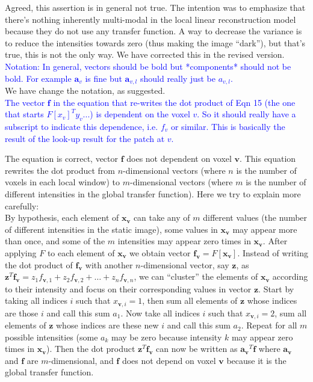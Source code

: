 \documentclass[onecolumn]{IEEEtran}
\begin{document}
Agreed, this assertion is in general not true. The intention was to emphasize that there’s nothing inherently multi-modal in the local linear reconstruction model because they do not use any transfer function. A way to decrease the variance is to reduce the intensities towards zero (thus making the image “dark”), but that’s true, this is not the only way. We have corrected this in the revised version.\\

\textcolor{blue}{Notation: In general, vectors should be bold but *components* should not be bold. For example $\mathbf{a}_v$ is fine but $\mathbf{a}_{v,l}$ should really just be $a_{v,l}$.}\\

We have change the notation, as suggested.\\

\textcolor{blue}{The vector $\mathbf{f}$ in the equation that re-writes the dot product of Eqn 15 (the one that starts $F[x_v]^T y_v ...$) is dependent on the voxel $v$. So it should really have a subscript to indicate this dependence, i.e. $f_v$ or similar. This is basically the result of the look-up result for the patch at $v$.}

The equation is correct, vector $\mathbf{f}$ does not dependent on voxel $\mathbf{v}$. This equation rewrites the dot product from $n$-dimensional vectors (where $n$ is the number of voxels in each local window) to $m$-dimensional vectors (where $m$ is the number of different intensities in the global transfer function). Here we try to explain more carefully:\\

By hypothesis, each element of $\mathbf{x_v}$ can take any of $m$ different values (the number of different intensities in the static image), some values in $\mathbf{x_v}$ may appear more than once, and some of the $m$ intensities may appear zero times in $\mathbf{x_v}$. After applying $F$ to each element of $\mathbf{x_v}$ we obtain vector $\mathbf{f_v} = F[\mathbf{x_v}]$. Instead of writing the dot product of $\mathbf{f_v}$ with another $n$-dimensional vector, say $\mathbf{z}$, as $\mathbf{z}^{T}\mathbf{f_v} = z_1 f_{\mathbf{v},1} + z_2 f_{\mathbf{v},2} + \hdots + z_n f_{\mathbf{v},n}$, we can “cluster” the elements of $\mathbf{x_v}$ according to their intensity and focus on their corresponding values in vector $\mathbf{z}$. Start by taking all indices $i$ such that $x_{\mathbf{v},i}=1$, then sum all elements of $\mathbf{z}$ whose indices are those $i$ and call this sum $a_1$. Now take all indices $i$ such that $x_{\mathbf{v}, i}=2$, sum all elements of $\mathbf{z}$ whose indices are these new $i$ and call this sum $a_2$. Repeat for all $m$ possible intensities (some $a_k$ may be zero because intensity $k$ may appear zero times in $\mathbf{x_v}$). Then the dot product $\mathbf{z}^{T}\mathbf{f_v}$ can now be written as $\mathbf{a_v}^T \mathbf{f}$ where $\mathbf{a_v}$ and $\mathbf{f}$ are $m$-dimensional, and $\mathbf{f}$ does not depend on voxel $\mathbf{v}$ because it is the global transfer function.\\
\end{document}
